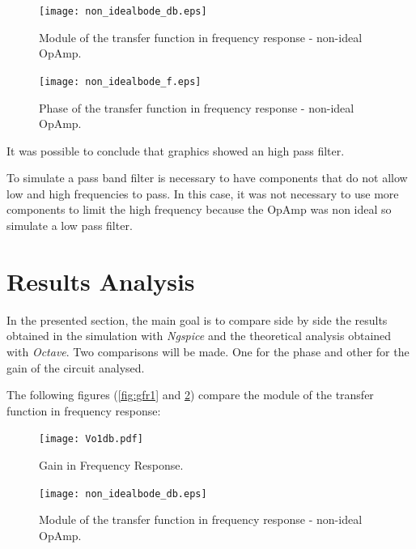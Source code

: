 \begin{figure}[h]
  \centering
  \begin{minipage}[b]{0.45\textwidth}
    \texttt{[image: non\_idealbode\_db.eps]}
    \caption{Module of the transfer function in frequency response - non-ideal OpAmp.}
    \label{fig:nonidealbode_db}
  \end{minipage}
  \hfill
  \begin{minipage}[b]{0.45\textwidth}
    \texttt{[image: non\_idealbode\_f.eps]}
    \caption{Phase of the transfer function in frequency response - non-ideal OpAmp.}
    \label{fig:nonidealbode_f}
  \end{minipage}
\end{figure}


It was possible to conclude that graphics showed an high pass filter. 

To simulate a pass band filter is necessary to have components that do not allow low and high frequencies to pass. In this case, it was not necessary to use more components to limit the high frequency because the OpAmp was non ideal so simulate a low pass filter.

\newpage
\section{Results Analysis}
\label{sec:resultsanalysis}

In the presented section, the main goal is to compare side by side the results obtained in the simulation with \textit{Ngspice} and the theoretical analysis obtained with \textit{Octave}. Two comparisons will be made. One for the phase and other for the gain of the circuit analysed. 

The following figures (\ref{fig:gfr1} and \ref{fig:nonidealbode_db1}) compare the module of the transfer function in frequency response:

\begin{figure}[h]
  \centering
  \begin{minipage}[b]{0.45\textwidth}
    \texttt{[image: Vo1db.pdf]}
    \caption{Gain in Frequency Response.}
    \label{fig:gfr1}
  \end{minipage}
  \hfill
  \begin{minipage}[b]{0.5\textwidth}
    \texttt{[image: non\_idealbode\_db.eps]}
    \caption{Module of the transfer function in frequency response - non-ideal OpAmp.}
    \label{fig:nonidealbode_db1}
  \end{minipage}
\end{figure}

